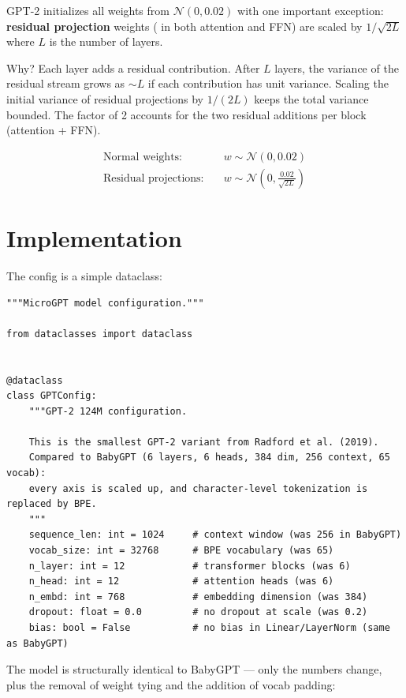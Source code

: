 GPT-2 initializes all weights from $\mathcal{N}(0, 0.02)$ with one important exception: \textbf{residual projection} weights ( in both attention and FFN) are scaled by $1/\sqrt{2L}$ where $L$ is the number of layers.

Why?  Each layer adds a residual contribution.  After $L$ layers, the variance of the residual stream grows as $\sim L$ if each contribution has unit variance.  Scaling the initial variance of residual projections by $1/(2L)$ keeps the total variance bounded.  The factor of 2 accounts for the two residual additions per block (attention + FFN).

\begin{align*}
\text{Normal weights:} \quad & w \sim \mathcal{N}(0, 0.02) \\
\text{Residual projections:} \quad & w \sim \mathcal{N}\!\left(0, \frac{0.02}{\sqrt{2L}}\right)
\end{align*}


\section{Implementation}

The config is a simple dataclass:

\begin{lstlisting}
"""MicroGPT model configuration."""

from dataclasses import dataclass


@dataclass
class GPTConfig:
    """GPT-2 124M configuration.

    This is the smallest GPT-2 variant from Radford et al. (2019).
    Compared to BabyGPT (6 layers, 6 heads, 384 dim, 256 context, 65 vocab):
    every axis is scaled up, and character-level tokenization is replaced by BPE.
    """
    sequence_len: int = 1024     # context window (was 256 in BabyGPT)
    vocab_size: int = 32768      # BPE vocabulary (was 65)
    n_layer: int = 12            # transformer blocks (was 6)
    n_head: int = 12             # attention heads (was 6)
    n_embd: int = 768            # embedding dimension (was 384)
    dropout: float = 0.0         # no dropout at scale (was 0.2)
    bias: bool = False           # no bias in Linear/LayerNorm (same as BabyGPT)
\end{lstlisting}

The model is structurally identical to BabyGPT --- only the numbers change, plus the removal of weight tying and the addition of vocab padding:

